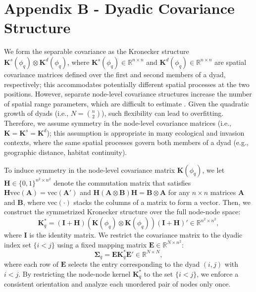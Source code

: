\documentclass{article}
\begin{document}
\section*{Appendix B - Dyadic Covariance Structure} 
We form the separable covariance as the Kronecker structure $\mathbf{K}^s(\phi_q)\otimes\mathbf{K}^d(\phi_q)$, where $\mathbf{K}^s(\phi_q)\in\mathbb{R}^{n\times n}$ and $\mathbf{K}^d(\phi_q)\in\mathbb{R}^{n\times n}$ are spatial covariance matrices defined over the first and second members of a dyad, respectively; this accommodates potentially different spatial processes at the two positions. 
However, separate node-level covariance structures increase the number of spatial range parameters, which are difficult to estimate \citep{zhang2004inconsistent}.  %
Given the quadratic growth of dyads (i.e., $N={n \choose 2}$), such flexibility can lead to overfitting.
Therefore, we assume symmetry in the node-level covariance matrices (i.e., $\mathbf{K}=\mathbf{K}^s=\mathbf{K}^d$); this assumption is appropriate in many ecological and invasion contexts, where the same spatial processes govern both members of a dyad (e.g., geographic distance, habitat continuity). 

To induce symmetry in the node-level covariance matrix $\mathbf{K}(\phi_q)$, we let $\mathbf{H}\in\{0,1\}^{n^2\times n^2}$ denote the commutation matrix that satisfies $\mathbf{H}\text{vec}(\mathbf{A})=\text{vec}(\mathbf{A}')$ and $\mathbf{H}(\mathbf{A}\otimes \mathbf{B})\mathbf{H}=\mathbf{B}\otimes \mathbf{A}$ for any $n \times n$ matrices $\mathbf{A}$ and $\mathbf{B}$, where $\text{vec}(\cdot)$ stacks the columns of a matrix to form a vector.  
Then, we construct the symmetrized Kronecker structure over the full node-node space: 
$$\mathbf{K}^*_q = (\mathbf{I}+\mathbf{H})(\mathbf{K}(\phi_q)\otimes \mathbf{K}(\phi_q))(\mathbf{I}+\mathbf{H})'\in\mathbb{R}^{n^2\times n^2},$$ 
where $\mathbf{I}$ is the identity matrix. We restrict the covariance matrix to the dyadic index set $\{i<j\}$ using a fixed mapping matrix $\mathbf{E}\in\mathbb{R}^{N\times n^2}$:
\begin{equation}\label{eq:kron}
    \boldsymbol{\Sigma}_q=\mathbf{E}\mathbf{K}^*_q\mathbf{E}'\in\mathbb{R}^{N\times N},
\end{equation}
where each row of $\mathbf{E}$ selects the entry corresponding to the dyad $(i,j)$ with $i<j$. By restricting the node-node kernel $\mathbf{K}^*_q$ to the set $\{i<j\}$, we enforce a consistent orientation and analyze each unordered pair of nodes only once. 
\end{document}
